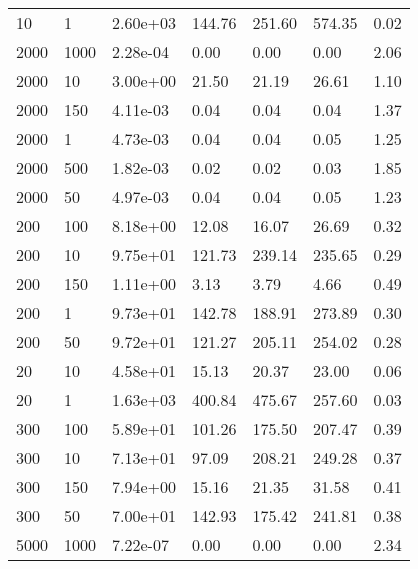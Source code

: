 \begin{table}
\begin{tabular}{lllllll}
10        &   1         &   2.60e+03  &   144.76    &   251.60    &   574.35    &   0.02      \\ 
2000      &   1000      &   2.28e-04  &   0.00      &   0.00      &   0.00      &   2.06      \\ 
2000      &   10        &   3.00e+00  &   21.50     &   21.19     &   26.61     &   1.10      \\ 
2000      &   150       &   4.11e-03  &   0.04      &   0.04      &   0.04      &   1.37      \\ 
2000      &   1         &   4.73e-03  &   0.04      &   0.04      &   0.05      &   1.25      \\ 
2000      &   500       &   1.82e-03  &   0.02      &   0.02      &   0.03      &   1.85      \\ 
2000      &   50        &   4.97e-03  &   0.04      &   0.04      &   0.05      &   1.23      \\ 
200       &   100       &   8.18e+00  &   12.08     &   16.07     &   26.69     &   0.32      \\ 
200       &   10        &   9.75e+01  &   121.73    &   239.14    &   235.65    &   0.29      \\ 
200       &   150       &   1.11e+00  &   3.13      &   3.79      &   4.66      &   0.49      \\ 
200       &   1         &   9.73e+01  &   142.78    &   188.91    &   273.89    &   0.30      \\ 
200       &   50        &   9.72e+01  &   121.27    &   205.11    &   254.02    &   0.28      \\ 
20        &   10        &   4.58e+01  &   15.13     &   20.37     &   23.00     &   0.06      \\ 
20        &   1         &   1.63e+03  &   400.84    &   475.67    &   257.60    &   0.03      \\ 
300       &   100       &   5.89e+01  &   101.26    &   175.50    &   207.47    &   0.39      \\ 
300       &   10        &   7.13e+01  &   97.09     &   208.21    &   249.28    &   0.37      \\ 
300       &   150       &   7.94e+00  &   15.16     &   21.35     &   31.58     &   0.41      \\ 
300       &   50        &   7.00e+01  &   142.93    &   175.42    &   241.81    &   0.38      \\ 
5000      &   1000      &   7.22e-07  &   0.00      &   0.00      &   0.00      &   2.34      \\ 

\end{tabular}
\end{table}
